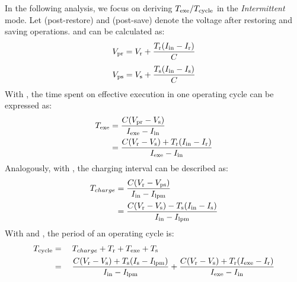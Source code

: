 In the following analysis, we focus on deriving $T_{\text{exe}} / T_{\text{cycle}}$ in the \textit{Intermittent} mode. Let  (post-restore) and  (post-save) denote the voltage after restoring and saving operations.  and  can be calculated as:
\begin{equation}
    V_{\text{pr}} = V_{\text{r}} + \frac{T_{\text{r}} (I_{\text{in}} - I_{\text{r}})}{C}
    \label{eq:vpr}
\end{equation}
\begin{equation}
    V_{\text{ps}} = V_{\text{s}} + \frac{T_{\text{s}} (I_{\text{in}} - I_{\text{s}})}{C}
    \label{eq:vps}
\end{equation}
With , the time spent on effective execution  in one operating cycle can be expressed as:
\begin{equation}
    \begin{aligned}
        T_{\text{exe}} & = \frac{C(V_{\text{pr}} - V_{\text{s}})}{I_{\text{exe}} - I_{\text{in}}} \\
        & = \frac{C(V_{\text{r}} - V_{\text{s}}) + T_{\text{r}} (I_{\text{in}} - I_{\text{r}})} {I_{\text{exe}} - I_{\text{in}}}
    \end{aligned}
    \label{eq:texe}
\end{equation}
Analogously, with , the charging interval can be described as:
\begin{equation}
    \begin{aligned}
        T_{charge} & = \frac{C(V_{\text{r}} - V_{\text{ps}})}{I_{\text{in}} - I_{\text{lpm}}} \\
        & = \frac{C(V_{\text{r}} - V_{\text{s}}) - T_{\text{s}} (I_{\text{in}} - I_{\text{s}})} {I_{\text{in}} - I_{\text{lpm}}}
    \end{aligned}
    \label{eq:tcharge}
\end{equation}
With  and , the period of an operating cycle is:
\begin{equation}
    \begin{aligned}
        T_{\text{cycle}} & = \quad T_{charge} + T_{\text{r}} + T_{\text{exe}} + T_{\text{s}} \\
        & = \quad \frac{C (V_{\text{r}} - V_{\text{s}}) + T_{\text{s}} (I_{\text{s}} - I_{\text{lpm}})}{I_{\text{in}} - I_{\text{lpm}}} + \frac{C (V_{\text{r}} - V_{\text{s}}) + T_{\text{r}} (I_{\text{exe}} - I_{\text{r}})}{I_{\text{exe}} - I_{\text{in}}}
    \end{aligned}
    \label{eq:tperiod}
\end{equation}

